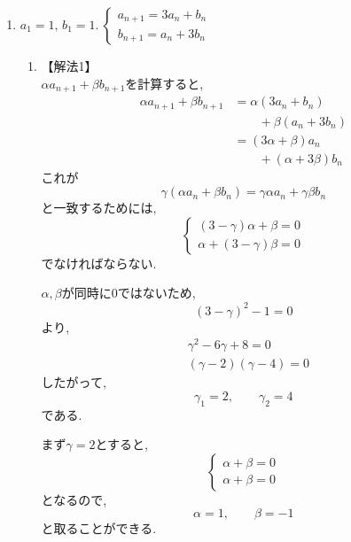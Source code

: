     \noindent{}
    \begin{enumerate}[label=(\arabic*),parsep=3pt,format=\bookitemlink{example-system-1}{solution}{problem}]
    \item $\displaystyle a_1=1,\,b_1=1.\ \begin{cases}a_{n+1}=3a_n+b_n\\ b_{n+1}=a_n+3b_n\end{cases}$\\
          \begin{enumerate}
            \item 【解法1】\\
                  $\alpha a_{n+1}+\beta b_{n+1}$を計算すると,
                  \begin{align*}
                    \alpha a_{n+1}+\beta b_{n+1}
                      &=\alpha(3a_n+b_n)\\
                      &\qquad +\beta(a_n+3b_n)\\
                      &=(3\alpha+\beta)a_n\\
                      &\qquad +(\alpha+3\beta)b_n
                  \end{align*}
                  これが
                  \[
                    \gamma(\alpha a_n+\beta b_n)
                    =\gamma\alpha a_n+\gamma\beta b_n
                  \]
                  と一致するためには,
                  \[
                  \begin{cases}
                    (3-\gamma)\alpha+\beta=0\\
                    \alpha+(3-\gamma)\beta=0
                  \end{cases}
                  \]
                  でなければならない.

                  $\alpha,\beta$が同時に$0$ではないため,
                  \[
                    (3-\gamma)^2-1=0
                  \]
                  より,
                  \begin{align*}
                    &\gamma^2-6\gamma+8=0\\
                    &(\gamma-2)(\gamma-4)=0
                  \end{align*}
                  したがって,
                  \[
                    \gamma_1=2,\qquad\gamma_2=4
                  \]
                  である.

                  まず$\gamma=2$とすると,
                  \[
                  \begin{cases}
                    \alpha+\beta=0\\
                    \alpha+\beta=0
                  \end{cases}
                  \]
                  となるので,
                  \[
                    \alpha=1,\qquad\beta=-1
                  \]
                  と取ることができる.


\end{enumerate}
\end{enumerate}
